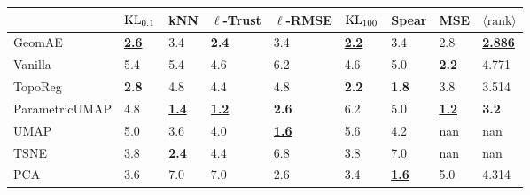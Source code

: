 \begin{tabular}{lllllllll}
\toprule
{} &               $\operatorname{KL}_{0.1}$ &                        kNN &               $\ell$-Trust &                $\ell$-RMSE &               $\operatorname{KL}_{100}$ &                      Spear &                        MSE & $\langle \text{rank} \rangle$ \\
\midrule
GeomAE         &   \underline{\textbf{2.6}} &                        3.4 &               \textbf{2.4} &                        3.4 &   \underline{\textbf{2.2}} &                        3.4 &                        2.8 &    \underline{\textbf{2.886}} \\
Vanilla        &                        5.4 &                        5.4 &                        4.6 &                        6.2 &                        4.6 &                        5.0 &               \textbf{2.2} &                         4.771 \\
TopoReg        &               \textbf{2.8} &                        4.8 &                        4.4 &                        4.8 &               \textbf{2.2} &               \textbf{1.8} &                        3.8 &                         3.514 \\
ParametricUMAP &                        4.8 &   \underline{\textbf{1.4}} &   \underline{\textbf{1.2}} &               \textbf{2.6} &                        6.2 &                        5.0 &   \underline{\textbf{1.2}} &                  \textbf{3.2} \\
UMAP           &                        5.0 &                        3.6 &                        4.0 &   \underline{\textbf{1.6}} &                        5.6 &                        4.2 &                        nan &                           nan \\
TSNE           &                        3.8 &               \textbf{2.4} &                        4.4 &                        6.8 &                        3.8 &                        7.0 &                        nan &                           nan \\
PCA            &                        3.6 &                        7.0 &                        7.0 &                        2.6 &                        3.4 &   \underline{\textbf{1.6}} &                        5.0 &                         4.314 \\
\bottomrule
\end{tabular}
